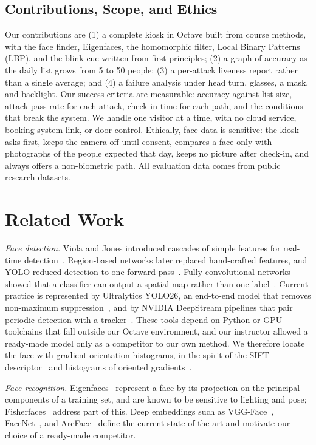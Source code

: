 \documentclass[conference,a4paper]{IEEEtran}
\begin{document}
\subsection{Contributions, Scope, and Ethics}
Our contributions are (1) a complete kiosk in Octave built from course methods, with the face finder, Eigenfaces, the homomorphic filter, Local Binary Patterns (LBP), and the blink cue written from first principles; (2) a graph of accuracy as the daily list grows from 5 to 50 people; (3) a per-attack liveness report rather than a single average; and (4) a failure analysis under head turn, glasses, a mask, and backlight. Our success criteria are measurable: accuracy against list size, attack pass rate for each attack, check-in time for each path, and the conditions that break the system. We handle one visitor at a time, with no cloud service, booking-system link, or door control. Ethically, face data is sensitive: the kiosk asks first, keeps the camera off until consent, compares a face only with photographs of the people expected that day, keeps no picture after check-in, and always offers a non-biometric path. All evaluation data comes from public research datasets.

\section{Related Work}
\emph{Face detection.} Viola and Jones introduced cascades of simple features for real-time detection~\cite{viola}. Region-based networks later replaced hand-crafted features, and YOLO reduced detection to one forward pass~\cite{yolo}. Fully convolutional networks showed that a classifier can output a spatial map rather than one label~\cite{fcn}. Current practice is represented by Ultralytics YOLO26, an end-to-end model that removes non-maximum suppression~\cite{ultralytics}, and by NVIDIA DeepStream pipelines that pair periodic detection with a tracker~\cite{deepstream}. These tools depend on Python or GPU toolchains that fall outside our Octave environment, and our instructor allowed a ready-made model only as a competitor to our own method. We therefore locate the face with gradient orientation histograms, in the spirit of the SIFT descriptor~\cite{sift} and histograms of oriented gradients~\cite{hog}.

\emph{Face recognition.} Eigenfaces~\cite{turk} represent a face by its projection on the principal components of a training set, and are known to be sensitive to lighting and pose; Fisherfaces~\cite{fisher} address part of this. Deep embeddings such as VGG-Face~\cite{vggface}, FaceNet~\cite{facenet}, and ArcFace~\cite{arcface} define the current state of the art and motivate our choice of a ready-made competitor.
\end{document}
